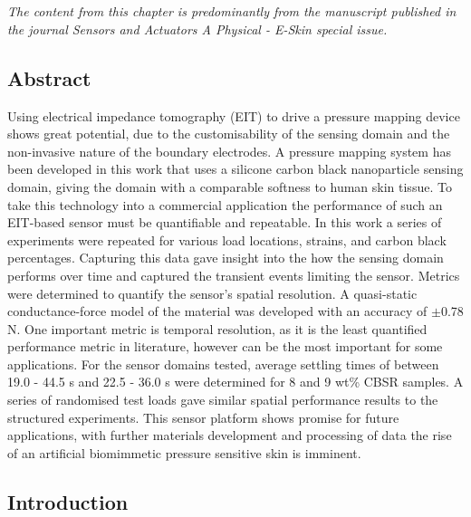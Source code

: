\chapter{\chapivname}
\label{chapter4}

\textit{The content from this chapter is predominantly from the manuscript published in the journal Sensors and Actuators A Physical - E-Skin special issue.}


\section*{Abstract}
Using electrical impedance tomography (EIT) to drive a pressure mapping device shows great potential, due to the customisability of the sensing domain and the non-invasive nature of the boundary electrodes. A pressure mapping system has been developed in this work that uses a silicone carbon black nanoparticle sensing domain, giving the domain with a comparable softness to human skin tissue. To take this technology into a commercial application the performance of such an EIT-based sensor must be quantifiable and repeatable. In this work a series of experiments were repeated for various load locations, strains, and carbon black percentages. Capturing this data gave insight into the how the sensing domain performs over time and captured the transient events limiting the sensor. Metrics were determined to quantify the sensor's spatial resolution. A quasi-static conductance-force model of the material was developed with an accuracy of $\pm$0.78 N. One important metric is temporal resolution, as it is the least quantified performance metric in literature, however can be the most important for some applications. For the sensor domains tested, average settling times of between 19.0 - 44.5 s and 22.5 - 36.0 s were determined for 8 and 9 wt\% CBSR samples. A series of randomised test loads gave similar spatial performance results to the structured experiments. This sensor platform shows promise for future applications, with further materials development and processing of data the rise of an artificial biomimmetic pressure sensitive skin is imminent.


\section{Introduction} \label{sec:introduction}


